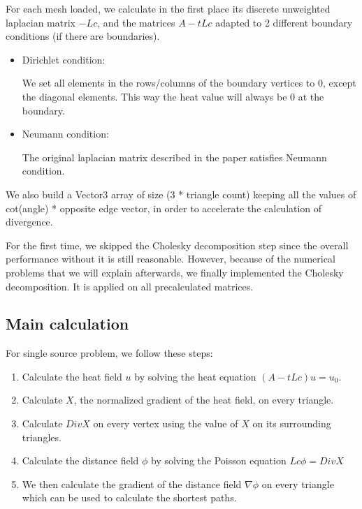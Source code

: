 \documentclass[a4paper,12pt,twoside]{article}
\begin{document}
For each mesh loaded, we calculate in the first place its discrete unweighted laplacian matrix $-Lc$, and the matrices $A-tLc$ adapted to 2 different boundary conditions (if there are boundaries).

\begin{itemize}
\item
Dirichlet condition:

We set all elements in the rows/columns of the boundary vertices to 0, except the diagonal elements. This way the heat value will always be 0 at the boundary.

\item
Neumann condition:

The original laplacian matrix described in the paper satisfies Neumann condition.
\end{itemize}


We also build a Vector3 array of size (3 * triangle count) keeping all the values of cot(angle) * opposite edge vector, in order to accelerate the calculation of divergence.

For the first time, we skipped the Cholesky decomposition step since the overall performance without it is still reasonable. However, because of the numerical problems that we will explain afterwards, we finally implemented the Cholesky decomposition. It is applied on all precalculated matrices.

\subsection{Main calculation}

For single source problem, we follow these steps:

\begin{enumerate}
\item
Calculate the heat field $u$ by solving the heat equation $(A-tLc)u = u_0$.
\item
Calculate $X$, the normalized gradient of the heat field, on every triangle.
\item
Calculate $DivX$ on every vertex using the value of $X$ on its surrounding triangles.
\item
Calculate the distance field $\phi$ by solving the Poisson equation $Lc \phi = DivX$
\item
We then calculate the gradient of the distance field $\nabla \phi$ on every triangle which can be used to calculate the shortest paths.
\end{enumerate}
\end{document}
